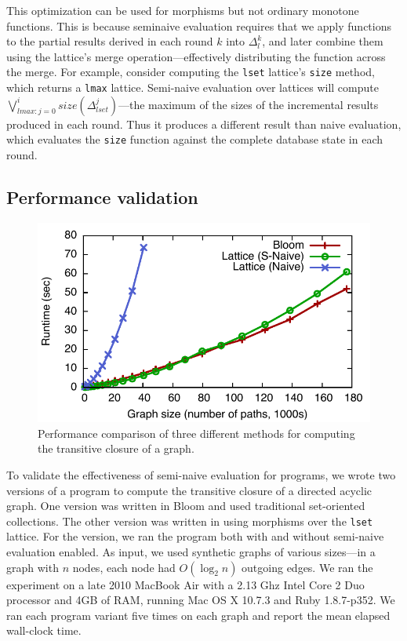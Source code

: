This optimization can be used for morphisms but not ordinary monotone
functions. This is because seminaive evaluation requires that we apply
functions to the partial results derived in each round $k$ into $\Delta_l^k$,
and later combine them using the lattice's merge operation---effectively
distributing the function across the merge.   
For example, consider computing the \texttt{lset} lattice's \texttt{size}
method, which returns a \texttt{lmax} lattice.  Semi-naive evaluation over
lattices 
will compute $\bigvee_{lmax:j=0}^i size(\Delta^j_{lset})$---the maximum
of the sizes of the incremental results produced in each round.
Thus it produces a 
different result than naive evaluation, which evaluates the \texttt{size}
function against the complete database state in each round.


\subsection{Performance validation}
\label{sec:lattice-perf}
\begin{figure}[t]
\includegraphics[width=\linewidth]{fig/sn_perf}
\caption{Performance comparison of three different methods for computing the
  transitive closure of a graph.}
\label{fig:tc-perf-graph}
\end{figure}

To validate the effectiveness of semi-naive evaluation for \lang programs, we
wrote two versions of a program to compute the transitive closure of a directed
acyclic graph. One version was written in Bloom and used traditional
set-oriented collections. The other version was written in \lang using morphisms
over the \texttt{lset} lattice. For the \lang version, we ran the program both
with and without semi-naive evaluation enabled. As input, we used synthetic
graphs of various sizes---in a graph with $n$ nodes, each node had $O(\log_2 n)$
outgoing edges. We ran the experiment on a late 2010 MacBook Air with a 2.13 Ghz
Intel Core 2 Duo processor and 4GB of RAM, running Mac OS X 10.7.3 and Ruby
1.8.7-p352. We ran each program variant five times on each graph and report the
mean elapsed wall-clock time.


